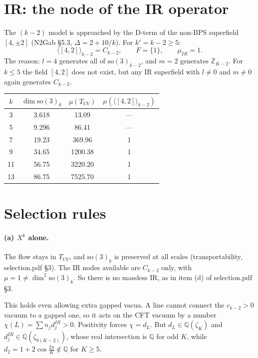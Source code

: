 \documentclass[11pt]{article}
\newcommand{\so}{\mathrm{so}(3)_k}
\newcommand{\Z}{\mathbb{Z}}
\newcommand{\Q}{\mathbb{Q}}
\begin{document}
\section{IR: the node of the IR operator}

The $(k-2)$ model is approached by the D-term of the non-BPS superfield $[4,\pm2]$ (N2Gab \S5.3, $\Delta=2+10/k$). For $k'=k-2\ge5$:
\begin{equation}
\langle[4,2]\rangle_{k-2}=C_{k-2},\qquad F=\{1\},\qquad \mu_{IR}=1 .
\end{equation}
The reason: $l=4$ generates all of $\mathrm{so}(3)_{k-2}$, and $m=2$ generates $\Z_{K-2}$. For $k\le5$ the field $[4,2]$ does not exist, but any IR superfield with $l\neq0$ and $m\neq0$ again generates $C_{k-2}$.

\begin{center}\small
\begin{tabular}{cccc}
\toprule
$k$ & $\dim\so$ & $\mu(T_{UV})$ & $\mu(\langle[4,2]\rangle_{k-2})$\\
\midrule
3 & 3.618 & 13.09 & ---\\
5 & 9.296 & 86.41 & ---\\
7 & 19.23 & 369.96 & 1\\
9 & 34.65 & 1200.38 & 1\\
11 & 56.75 & 3220.20 & 1\\
13 & 86.75 & 7525.70 & 1\\
\bottomrule
\end{tabular}
\end{center}

\section{Selection rules}

\paragraph{(a) $X^k$ alone.} The flow stays in $T_{UV}$, and $\so$ is preserved at all scales (transportability, selection.pdf \S3). The IR nodes available are $C_{k-2}$ only, with $\mu=1\neq\dim^2\so$. So there is no massless IR, as in item (d) of selection.pdf \S3.

This holds even allowing extra gapped vacua. A line cannot connect the $c_{k-2}>0$ vacuum to a gapped one, so it acts on the CFT vacuum by a number $\chi(L)=\sum n_jd_j^{IR}>0$. Positivity forces $\chi=d_L$. But $d_L\in\Q(\zeta_K)$ and $d_j^{IR}\in\Q(\zeta_{8(K-2)})$, whose real intersection is $\Q$ for odd $K$, while $d_2=1+2\cos\frac{2\pi}K\notin\Q$ for $K\ge5$.
\end{document}
